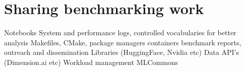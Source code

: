 \section{Sharing benchmarking work}
\label{sec:share}

Notebooks
System and performance logs, controlled vocabularies for better analysis
Makefiles, CMake, package managers
containers
benchmark reports, outreach and dissemination
Libraries (HuggingFace, Nvidia etc)
Data API’s (Dimension.ai etc)
Workload management
MLCommons